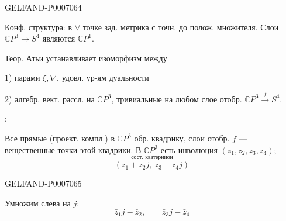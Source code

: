 \begin{GelfandAdjacentEvidence}{GELFAND-P000706}{4}


Конф. структура: в \(\forall\) точке зад. метрика с точн. до полож. множителя.
Слои \(\mathbb C P^3\to S^4\) являются \(\mathbb C P^1\).

Теор. Атьи устанавливает изоморфизм между

1) парами \(\xi,\nabla\), удовл. ур-ям дуальности

2) алгебр. вект. рассл. на \(\mathbb C P^3\), тривиальные на любом слое отобр.
\(\mathbb C P^3\overset{f}{\to}S^4\).

:

Все прямые (проект. компл.) в \(\mathbb C P^3\) обр. квадрику, слои отобр. \(f\) --- вещественные точки этой квадрики.
В \(\mathbb C P^3\) есть инволюция \((z_1,z_2,z_3,z_4)\);
\[
\overset{\text{сост. кватернион}}{(z_1+z_2j,\ z_3+z_4j)}
\]
\end{GelfandAdjacentEvidence}
\begin{GelfandAdjacentEvidence}{GELFAND-P000706}{5}

\end{GelfandAdjacentEvidence}


Умножим слева на \(j\):
\[
\bar z_1j-\bar z_2,\qquad \bar z_3j-\bar z_4
\]


